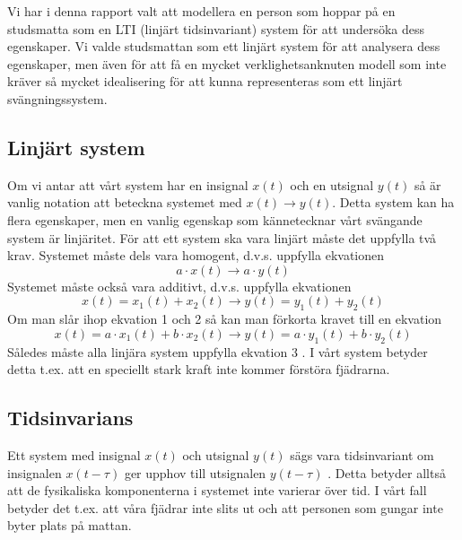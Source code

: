 \documentclass[10pt,a4paper]{article}
\begin{document}
Vi har i denna rapport valt att modellera en person som hoppar på en studsmatta som en LTI (linjärt tidsinvariant) system för att undersöka dess egenskaper. Vi valde studsmattan som ett linjärt system för att analysera dess egenskaper, men även för att få en mycket verklighetsanknuten modell som inte kräver så mycket idealisering för att kunna representeras som ett linjärt svängningssystem.
\newpage

\subsection{Linjärt system}

Om vi antar att vårt system har en insignal $x(t)$ och en utsignal $y(t)$ så är vanlig notation att beteckna systemet med $x(t) \rightarrow y(t)$. Detta system kan ha flera egenskaper, men en vanlig egenskap som kännetecknar vårt svängande system är linjäritet. För att ett system ska vara linjärt måste det uppfylla två krav. Systemet måste dels vara homogent, d.v.s. uppfylla ekvationen
\begin{equation}
a \cdot x(t) \rightarrow a \cdot y(t) 
\end{equation}
Systemet måste också vara additivt, d.v.s. uppfylla ekvationen
\begin{equation}
x(t) = x_1(t) + x_2(t) \rightarrow y(t) = y_1(t) + y_2(t)
\end{equation}
Om man slår ihop ekvation 1 och 2 så kan man förkorta kravet till en ekvation
\begin{equation}
x(t) = a \cdot x_1(t) + b \cdot x_2(t)\rightarrow y(t) = a \cdot y_1(t) + b \cdot y_2(t)
\end{equation}
\linebreak
Således måste alla linjära system uppfylla ekvation 3 \cite{sune2000}.
I vårt system betyder detta t.ex. att en speciellt stark kraft inte kommer förstöra fjädrarna.


\subsection{Tidsinvarians}


Ett system med insignal $x(t)$ och utsignal $y(t)$ sägs vara tidsinvariant om insignalen $x(t - \tau)$ ger upphov till utsignalen $y(t - \tau)$ \cite{sune2000}. Detta betyder alltså att de fysikaliska komponenterna i systemet inte varierar över tid. I vårt fall betyder det t.ex. att våra fjädrar inte slits ut och att personen som gungar inte byter plats på mattan. 
\end{document}
